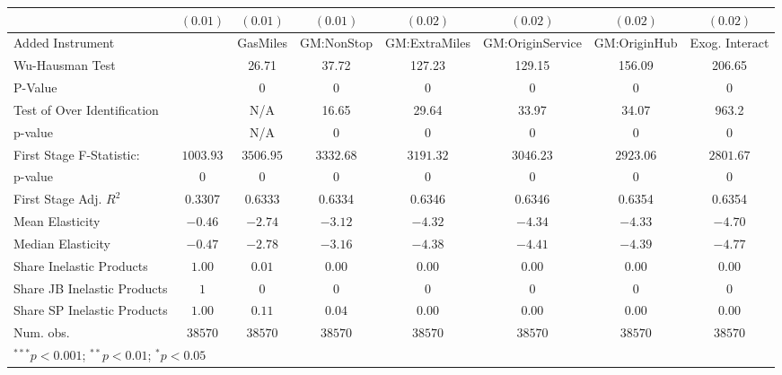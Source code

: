 \begin{tabular}{l c c c c c c c}
                             & $(0.01)$      & $(0.01)$      & $(0.01)$      & $(0.02)$      & $(0.02)$         & $(0.02)$      & $(0.02)$       \\
\midrule
Added Instrument             &               & GasMiles      & GM:NonStop    & GM:ExtraMiles & GM:OriginService & GM:OriginHub  & Exog. Interact \\
Wu-Hausman Test              &               & 26.71         & 37.72         & 127.23        & 129.15           & 156.09        & 206.65         \\
P-Value                      &               & 0             & 0             & 0             & 0                & 0             & 0              \\
Test of Over Identification  &               & N/A           & 16.65         & 29.64         & 33.97            & 34.07         & 963.2          \\
p-value                      &               & N/A           & 0             & 0             & 0                & 0             & 0              \\
First Stage F-Statistic:     & $1003.93$     & $3506.95$     & $3332.68$     & $3191.32$     & $3046.23$        & $2923.06$     & $2801.67$      \\
p-value                      & $0$           & $0$           & $0$           & $0$           & $0$              & $0$           & $0$            \\
First Stage Adj. $R^2$       & 0.3307        & 0.6333        & 0.6334        & 0.6346        & 0.6346           & 0.6354        & 0.6354         \\
Mean Elasticity              & $-0.46$       & $-2.74$       & $-3.12$       & $-4.32$       & $-4.34$          & $-4.33$       & $-4.70$        \\
Median Elasticity            & $-0.47$       & $-2.78$       & $-3.16$       & $-4.38$       & $-4.41$          & $-4.39$       & $-4.77$        \\
Share Inelastic Products     & $1.00$        & $0.01$        & $0.00$        & $0.00$        & $0.00$           & $0.00$        & $0.00$         \\
Share JB Inelastic Products  & $1$           & $0$           & $0$           & $0$           & $0$              & $0$           & $0$            \\
Share SP Inelastic Products  & $1.00$        & $0.11$        & $0.04$        & $0.00$        & $0.00$           & $0.00$        & $0.00$         \\
Num. obs.                    & $38570$       & $38570$       & $38570$       & $38570$       & $38570$          & $38570$       & $38570$        \\
\bottomrule
\multicolumn{8}{l}{\scriptsize{$^{***}p<0.001$; $^{**}p<0.01$; $^{*}p<0.05$}}
\end{tabular}
